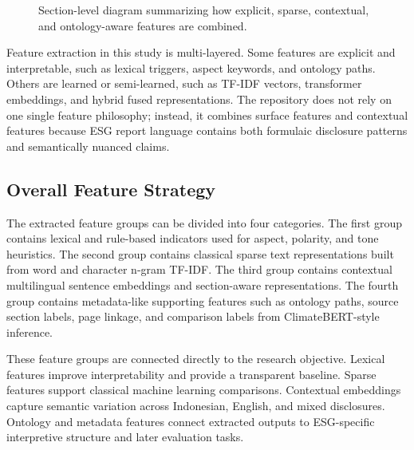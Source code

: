 \begin{figure}[ht]
\begin{center}
\end{center}
\caption{Section-level diagram summarizing how explicit, sparse, contextual, and ontology-aware features are combined.}
\label{fig:implementation-features}
\end{figure}

Feature extraction in this study is multi-layered. Some features are explicit and interpretable, such as lexical triggers, aspect keywords, and ontology paths. Others are learned or semi-learned, such as TF-IDF vectors, transformer embeddings, and hybrid fused representations. The repository does not rely on one single feature philosophy; instead, it combines surface features and contextual features because ESG report language contains both formulaic disclosure patterns and semantically nuanced claims.

\subsection{Overall Feature Strategy}

The extracted feature groups can be divided into four categories. The first group contains lexical and rule-based indicators used for aspect, polarity, and tone heuristics. The second group contains classical sparse text representations built from word and character n-gram TF-IDF. The third group contains contextual multilingual sentence embeddings and section-aware representations. The fourth group contains metadata-like supporting features such as ontology paths, source section labels, page linkage, and comparison labels from ClimateBERT-style inference.

These feature groups are connected directly to the research objective. Lexical features improve interpretability and provide a transparent baseline. Sparse features support classical machine learning comparisons. Contextual embeddings capture semantic variation across Indonesian, English, and mixed disclosures. Ontology and metadata features connect extracted outputs to ESG-specific interpretive structure and later evaluation tasks.

